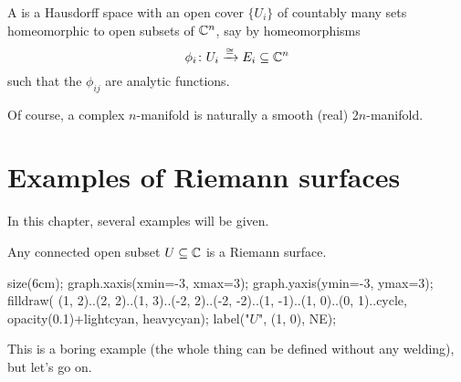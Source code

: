 \begin{definition}
	A  is a Hausdorff space with an open cover $\{ U_i \}$ of countably
	many sets homeomorphic to open subsets of $\mathbb C^n$, say by homeomorphisms
	\[ \phi_i \colon U_i \xrightarrow{\cong} E_i \subseteq \mathbb C^n \]
	such that the  $\phi_{ij}$ are analytic functions.
\end{definition}
Of course, a complex $n$-manifold is naturally a smooth (real) $2n$-manifold.

\section{Examples of Riemann surfaces}

In this chapter, several examples will be given.
\begin{example}
	Any connected open subset $U \subseteq \mathbb C$ is a Riemann surface.
	\begin{center}
		\begin{asy}
			size(6cm);
			graph.xaxis(xmin=-3, xmax=3);
			graph.yaxis(ymin=-3, ymax=3);
			filldraw(
				(1, 2)..(2, 2)..(1, 3)..(-2, 2)..(-2, -2)..(1, -1)..(1, 0)..(0, 1)..cycle,
				opacity(0.1)+lightcyan, heavycyan);
			label("$U$", (1, 0), NE);
		\end{asy}
	\end{center}

	This is a boring example (the whole thing can be defined without any welding), but let's go on.
\end{example}

